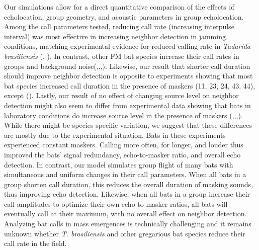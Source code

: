 \documentclass[
]{book}
\begin{document}
Our simulations allow for a direct quantitative comparison of the effects of echolocation, group geometry, and acoustic parameters in group echolocation. Among the call parameters tested, reducing call rate (increasing interpulse interval) was most effective in increasing neighbor detection in jamming conditions, matching experimental evidence for reduced calling rate in \emph{Tadarida brasiliensis} (\citet{jarvis2013a}, \citet{adams2017a}). In contrast, other FM bat species increase their call rates in groups and background noise(\citet{amichai2015a},\citet{lin2016a},\citet{cvikel2015b},\citet{luo2015a}). Likewise, our result that shorter call duration should improve neighbor detection is opposite to experiments showing that most bat species increased call duration in the presence of maskers (11, 23, 24, 43, 44), except (\citet{cvikel2015b}). Lastly, our result of no effect of changing source level on neighbor detection might also seem to differ from experimental data showing that bats in laboratory conditions do increase source level in the presence of maskers (\citet{amichai2015a},\citet{tressler2009a},\citet{luo2015a},\citet{hase2016a}). While there might be species-specific variation, we suggest that these differences are mostly due to the experimental situation. Bats in these experiments experienced constant maskers. Calling more often, for longer, and louder thus improved the bats' signal redundancy, echo-to-masker ratio, and overall echo detection. In contrast, our model simulates group flight of many bats with simultaneous and uniform changes in their call parameters. When all bats in a group shorten call duration, this reduces the overall duration of masking sounds, thus improving echo detection. Likewise, when all bats in a group increase their call amplitudes to optimize their own echo-to-masker ratios, all bats will eventually call at their maximum, with no overall effect on neighbor detection. Analyzing bat calls in mass emergences is technically challenging and it remains unknown whether \emph{T. brasiliensis} and other gregarious bat species reduce their call rate in the field.
\end{document}
